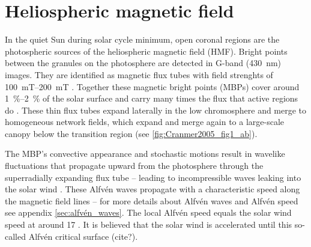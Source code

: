 \section{Heliospheric magnetic field}
\label{sec:heliospheric_magnetic_field}
In the quiet Sun during solar cycle minimum, open coronal regions are the photospheric sources of the heliospheric magnetic field (HMF). Bright points between the granules on the photosphere are detected in G-band (\SI{430}{\nano\meter}) images. They are identified as magnetic flux tubes with field strenghts of \SIrange{100}{200}{\milli\tesla} \citep{Cranmer2005}. Together these magnetic bright points (MBPs) cover around \SIrange{1}{2}{\%} of the solar surface and carry many times the flux that active regions do \citep{Sanchez_Almeida2010}. These thin flux tubes expand laterally in the low chromosphere and merge to homogeneous network fields, which expand and merge again to a large-scale canopy below the transition region (see \autoref{fig:Cranmer2005_fig1_ab}).
\begin{figure}[htb]
\end{figure}

The MBP's convective appearance and stochastic motions result in wavelike fluctuations that propagate upward from the photosphere through the superradially expanding flux tube -- leading to incompressible waves leaking into the solar wind \citep{Cranmer2005}. These Alfvén waves propagate with a characteristic speed along the magnetic field lines -- for more details about Alfvén waves and Alfvén speed see appendix \autoref{sec:alfvén_waves}. The local Alfvén speed equals the solar wind speed at around \SI{17}{\Rs} \citep{Sittler1999,Exarhos2000}. It is believed that the solar wind is accelerated until this so-called Alfvén critical surface (cite?).\\

